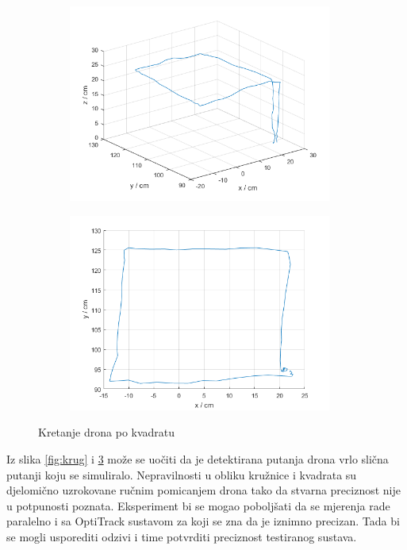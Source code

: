 \documentclass[times, utf8, diplomski]{fer}
\begin{document}
\begin{figure}[h]
\begin{subfigure}[b]{.5\textwidth}
\centering
	\includegraphics[width=0.95\textwidth]{kocka1}
	\caption*{}
	\label{fig:kocka_1}
\end{subfigure}
\begin{subfigure}[b]{.5\textwidth}
	\centering
	\includegraphics[width=0.95\textwidth]{kocka2}
	\caption*{}
	\label{fig:kocka_2}
\end{subfigure}
\caption{Kretanje drona po kvadratu}
\label{fig:kocka}
\end{figure}

Iz slika \ref{fig:krug} i \ref{fig:kocka} može se uočiti da je detektirana putanja drona vrlo slična putanji koju se simuliralo. Nepravilnosti u obliku kružnice i kvadrata su djelomično uzrokovane ručnim pomicanjem drona tako da stvarna preciznost nije u potpunosti poznata. Eksperiment bi se mogao poboljšati da se mjerenja rade paralelno i sa OptiTrack sustavom za koji se zna da je iznimno precizan. Tada bi se mogli usporediti odzivi i time potvrditi preciznost testiranog sustava. 
\end{document}
